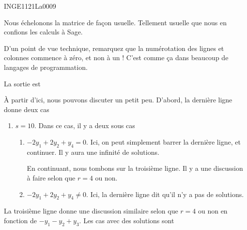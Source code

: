

\begin{corrige}{INGE1121La0009}

	Nous échelonons la matrice de façon usuelle. Tellement usuelle que nous en confions les calculs à Sage.


	D'un point de vue technique, remarquez que la numérotation des lignes et colonnes commence à zéro, et non à un ! C'est comme ça dans beaucoup de langages de programmation.

	La sortie est


	À partir d'ici, nous pouvons discuter un petit peu. D'abord, la dernière ligne donne deux cas
	\begin{enumerate}

		\item
			$s=10$. Dans ce cas, il y a deux sous cas
			\begin{enumerate}

				\item
					$-2y_1+2y_2+y_4=0$. Ici, on peut simplement barrer la dernière ligne, et continuer. Il y aura une infinité de solutions.

					
					En continuant, nous tombons sur la troisième ligne. Il y a une discussion à faire selon que $r=4$ ou non.
				\item $-2y_1+2y_2+y_4\neq 0$. Ici, la dernière ligne dit qu'il n'y a pas de solutions.

			\end{enumerate}
			

	\end{enumerate}
	
	La troisième ligne donne une discussion similaire selon que $r=4$ ou non en fonction de $-y_1-y_2+y_3$. Les cas avec des solutions sont
	\begin{enumerate}


\end{enumerate}
\end{corrige}

